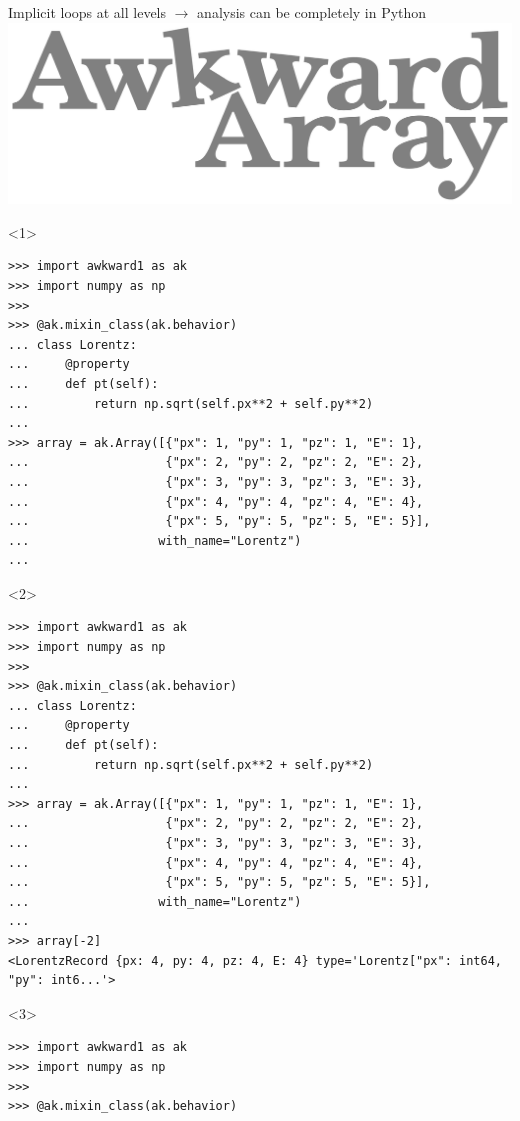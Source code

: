 \documentclass[aspectratio=169]{beamer}
\begin{document}
\begin{frame}[fragile]{Implicit loops at all levels $\to$ analysis can be completely in Python}
\vspace{0.2 cm}
\hfill \mbox{\includegraphics[height=1.5 cm]{img/awkward-logo.pdf}\hspace{-0.85 cm}}

\vspace{-1.5 cm}
\scriptsize
\begin{onlyenv}<1>
\begin{verbatim}
>>> import awkward1 as ak
>>> import numpy as np
>>> 
>>> @ak.mixin_class(ak.behavior)
... class Lorentz:
...     @property
...     def pt(self):
...         return np.sqrt(self.px**2 + self.py**2)
... 
>>> array = ak.Array([{"px": 1, "py": 1, "pz": 1, "E": 1},
...                   {"px": 2, "py": 2, "pz": 2, "E": 2},
...                   {"px": 3, "py": 3, "pz": 3, "E": 3},
...                   {"px": 4, "py": 4, "pz": 4, "E": 4},
...                   {"px": 5, "py": 5, "pz": 5, "E": 5}],
...                  with_name="Lorentz")
... 
\end{verbatim}
\vspace{3 cm}
\end{onlyenv}
\begin{onlyenv}<2>
\begin{verbatim}
>>> import awkward1 as ak
>>> import numpy as np
>>> 
>>> @ak.mixin_class(ak.behavior)
... class Lorentz:
...     @property
...     def pt(self):
...         return np.sqrt(self.px**2 + self.py**2)
... 
>>> array = ak.Array([{"px": 1, "py": 1, "pz": 1, "E": 1},
...                   {"px": 2, "py": 2, "pz": 2, "E": 2},
...                   {"px": 3, "py": 3, "pz": 3, "E": 3},
...                   {"px": 4, "py": 4, "pz": 4, "E": 4},
...                   {"px": 5, "py": 5, "pz": 5, "E": 5}],
...                  with_name="Lorentz")
... 
>>> array[-2]
<LorentzRecord {px: 4, py: 4, pz: 4, E: 4} type='Lorentz["px": int64, "py": int6...'>
\end{verbatim}
\vspace{3 cm}
\end{onlyenv}
\begin{onlyenv}<3>
\begin{verbatim}
>>> import awkward1 as ak
>>> import numpy as np
>>> 
>>> @ak.mixin_class(ak.behavior)

\end{verbatim}
\end{onlyenv}
\end{frame}
\end{document}
